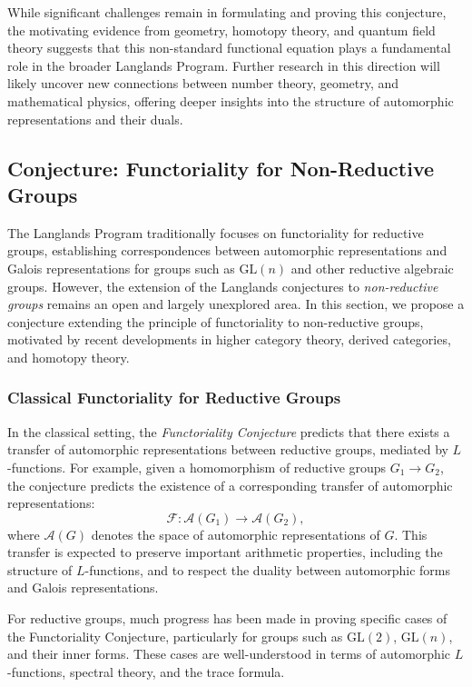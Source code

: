 \documentclass{article}
\theoremstyle{remark}
\begin{document}
While significant challenges remain in formulating and proving this conjecture, the motivating evidence from geometry, homotopy theory, and quantum field theory suggests that this non-standard functional equation plays a fundamental role in the broader Langlands Program. Further research in this direction will likely uncover new connections between number theory, geometry, and mathematical physics, offering deeper insights into the structure of automorphic representations and their duals.

\subsection{Conjecture: Functoriality for Non-Reductive Groups}

The Langlands Program traditionally focuses on functoriality for reductive groups, establishing correspondences between automorphic representations and Galois representations for groups such as $\text{GL}(n)$ and other reductive algebraic groups. However, the extension of the Langlands conjectures to \emph{non-reductive groups} remains an open and largely unexplored area. In this section, we propose a conjecture extending the principle of functoriality to non-reductive groups, motivated by recent developments in higher category theory, derived categories, and homotopy theory.

\subsubsection{Classical Functoriality for Reductive Groups}

In the classical setting, the \emph{Functoriality Conjecture} predicts that there exists a transfer of automorphic representations between reductive groups, mediated by $L$-functions. For example, given a homomorphism of reductive groups $G_1 \to G_2$, the conjecture predicts the existence of a corresponding transfer of automorphic representations:
\[
\mathcal{F}: \mathcal{A}(G_1) \to \mathcal{A}(G_2),
\]
where $\mathcal{A}(G)$ denotes the space of automorphic representations of $G$. This transfer is expected to preserve important arithmetic properties, including the structure of $L$-functions, and to respect the duality between automorphic forms and Galois representations.

For reductive groups, much progress has been made in proving specific cases of the Functoriality Conjecture, particularly for groups such as $\text{GL}(2)$, $\text{GL}(n)$, and their inner forms. These cases are well-understood in terms of automorphic $L$-functions, spectral theory, and the trace formula.
\end{document}

